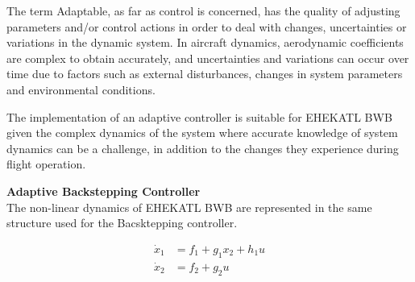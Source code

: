 The term Adaptable, as far as control is concerned, has the quality of adjusting parameters and/or control actions in order to deal with changes, uncertainties or variations in the dynamic system. In aircraft dynamics, aerodynamic coefficients are complex to obtain accurately, and uncertainties and variations can occur over time due to factors such as external disturbances, changes in system parameters and environmental conditions. 


The implementation of an adaptive controller is suitable for EHEKATL BWB given the complex dynamics of the system where accurate knowledge of system dynamics can be a challenge, in addition to the changes they experience during flight operation. 

\medskip

\textbf{Adaptive Backstepping Controller}\\
The non-linear dynamics of EHEKATL BWB are represented in the same structure used for the Bacsktepping controller. 

\begin{align}
    \dot x_{1} &= f_{1} + g_1 x_2 + h_1 u \\ \nonumber
    \dot x_{2} &= f_{2} + g_2 u \\ \nonumber
\end{align}

